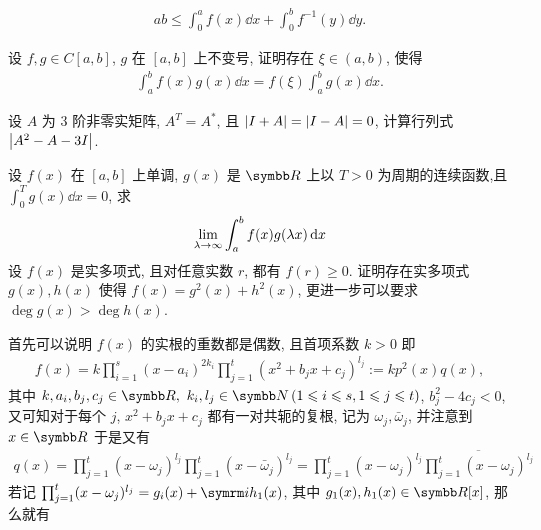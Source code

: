 \begin{exercise}[series=exer]
    \begin{align*}
        ab \le \int_{0}^{a}f(x) \dd{x} + \int_{0}^{b} f^{-1}(y) \dd{y}.
    \end{align*}
    \item 设 $ f, g \in C[a, b] $, $ g $ 在 $ [a, b] $ 上不变号, 证明存在 $ \xi\in (a, b) $, 使得
    \begin{align*}
        \int_{a}^{b} f(x)g(x) \dd{x} = f(\xi)\int_{a}^{b} g(x) \dd{x}.
    \end{align*}   
    \item 设 $ A $ 为 $ 3 $ 阶非零实矩阵, $ A^{T} = A^{*} $, 且 $ \abs{I + A} = \abs{I - A} = 0 $, 计算行列式 $ \abs{A^{2} - A - 3I} $.
    \item 设 $ f(x) $ 在 $ [a, b] $ 上单调, $ g(x) $ 是 $ \R $ 上以 $ T>0 $ 为周期的连续函数,且 $ \int_{0}^{T} g(x) \dd{x} = 0 $, 求
    \begin{align*}
        \lim_{\lambda \to \infty} \int_{a}^{b} f(x)g(\lambda x) \dd{x}
    \end{align*}
    \sitem 设 $ f(x) $ 是实多项式, 且对任意实数 $ r $, 都有 $ f(r) \ge 0 $. 证明存在实多项式 $ g(x), h(x) $ 使得 $ f(x) = g^{2}(x) + h^{2}(x) $, 更进一步可以要求 $ \deg g(x) > \deg h(x) $.   
    \begin{answer}
        \begin{answersheet}
            \item 首先可以说明 $ f(x) $ 的实根的重数都是偶数, 且首项系数 $ k > 0 $ 即
            \begin{align}
                f(x) = k\prod_{i = 1}^{s}(x - a_{i})^{2k_{i}}\prod_{j = 1}^{t}(x^{2} + b_{j}x + c_{j})^{l_{j}} := kp^{2}(x)q(x), \label{eq:f=kp2q}
            \end{align}
            其中 $ k, a_{i}, b_{j}, c_{j} \in \R,\ k_{i}, l_{j} \in \N \,(1 \le i \le s, 1 \le j \le t) $,  $ b_{j}^{2} - 4c_{j} < 0 $, 又可知对于每个 $ j $,  $ x^{2} + b_{j}x + c_{j} $ 都有一对共轭的复根, 记为 $ \omega_{j}, \bar{\omega}_{j} $, 并注意到 $ x \in \R $ 于是又有
            \begin{align*}
                q(x) = \prod_{j = 1}^{t} ( x - \omega_{j})^{l_{j}}\prod_{j = 1}^{t} ( x - \bar{\omega}_{j})^{l_{j}} = \prod_{j = 1}^{t} ( x - \omega_{j})^{l_{j}}\overline{\prod_{j = 1}^{t} ( x - \omega_{j})^{l_{j}}}
            \end{align*} 
            若记 $ \prod_{j = 1}^{t} ( x - \omega_{j})^{l_{j}} = g_{i}(x) + \mi h_{1}(x) $, 其中 $ g_{1}(x), h_{1}(x) \in \R[x] $, 那么就有
            \begin{align*}

\end{align*}
\end{answersheet}
\end{answer}
\end{exercise}
